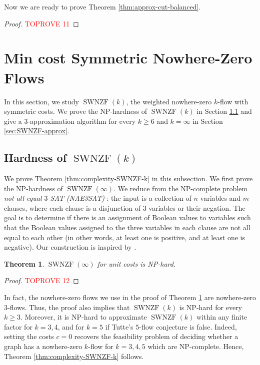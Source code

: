 \documentclass[11pt]{article}
\newtheorem{theorem}{Theorem}
\begin{document}
Now we are ready to prove Theorem \ref{thm:approx-cut-balanced}. 
\begin{proof}\textcolor{red}{TOPROVE 11}\end{proof}










\section{Min cost Symmetric Nowhere-Zero Flows}\label{sec:SWNZF}
In this section, we study $\operatorname{SWNZF}(k)$, the weighted nowhere-zero $k$-flow with symmetric costs. We prove the NP-hardness of $\operatorname{SWNZF}(k)$ in Section \ref{sec:SWNZF-hardness} and give a $3$-approximation algorithm for every $k\geq 6$ and $k=\infty$ in Section \ref{sec:SWNZF-approx}.

\subsection{Hardness of $\operatorname{SWNZF}(k)$}\label{sec:SWNZF-hardness}
We prove Theorem \ref{thm:complexity-SWNZF-k} in this subsection. We first prove the NP-hardness of $\operatorname{SWNZF}(\infty)$. We reduce from the NP-complete problem \emph{not-all-equal $3$-SAT (NAE3SAT)} \cite{schaefer1978complexity}: the input is a collection of $n$ variables and $m$ clauses, where each clause is a disjunction of $3$ variables or their negation. The goal is to determine if there is an assignment of Boolean values to variables such that the Boolean values assigned to the three variables in each clause are not all equal to each other (in other words, at least one is positive, and at least one is negative). Our construction is inspired by \cite{martinez2006complexity}.

\begin{theorem}\label{thm:complexity-SWNZF}
    $\operatorname{SWNZF}(\infty)$ for unit costs is NP-hard.
\end{theorem}
\begin{proof}\textcolor{red}{TOPROVE 12}\end{proof}
In fact, the nowhere-zero flows we use in the proof of Theorem \ref{thm:complexity-SWNZF} are nowhere-zero $3$-flows. Thus, the proof also implies that $\operatorname{SWNZF}(k)$ is NP-hard for every $k\geq 3$. Moreover, it is NP-hard to approximate $\operatorname{SWNZF}(k)$ within any finite factor for $k=3,4$, and for $k=5$ if Tutte's $5$-flow conjecture is false. Indeed, setting the costs $c=0$ recovers the feasibility problem of deciding whether a graph has a nowhere-zero $k$-flow for $k=3,4,5$ which are NP-complete.
Hence, Theorem \ref{thm:complexity-SWNZF-k} follows.
\end{document}
